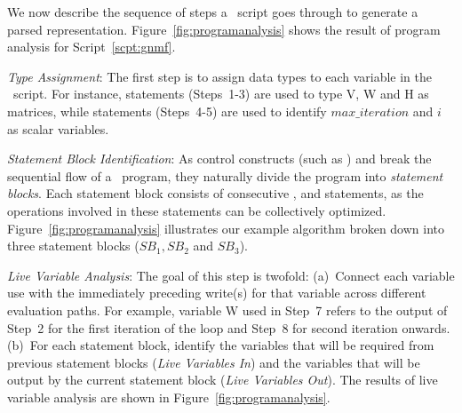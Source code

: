 
We now describe the sequence of steps a \dmlr\ script goes through to generate a parsed 
representation. Figure~\ref{fig:programanalysis} shows the result of program analysis for 
Script~\ref{scpt:gnmf}.

{\it Type Assignment}: The first step is to assign data types to
each variable in the \dmlr\ script. For instance, 
statements (Steps~1-3) are used to type V, W and H as matrices, while  
statements (Steps~4-5) are used to identify $max\_iteration$ and $i$ as scalar variables. 

{\it Statement Block Identification}: As control constructs (such as ) and 
 break the sequential flow of a \dmlr\ program, they naturally divide 
the program into \textit{statement blocks}. Each statement block consists of consecutive 
,  and  statements, as the operations 
involved in these statements can be collectively optimized. 
Figure~\ref{fig:programanalysis} illustrates our example algorithm broken down into three 
statement blocks ($SB_1, SB_2$ and $SB_3$).


{\it Live Variable Analysis}: The goal of this step is twofold:
(a)~Connect each variable use with the immediately preceding write(s)
for that variable across different evaluation paths. For example,
variable W used in Step~7 refers to the output of Step~2 for the
first iteration of the loop and Step~8 for second iteration onwards. (b)~For each statement block, identify the variables that will be required from previous
statement blocks ({\it Live Variables In}) and the variables that will
be output by the current statement block ({\it Live Variables Out}). 
The results of live variable analysis are shown in Figure~\ref{fig:programanalysis}.


